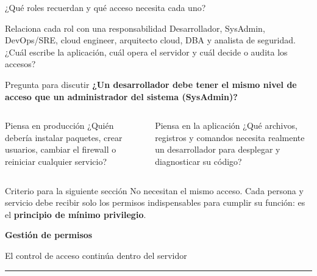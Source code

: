 \documentclass[aspectratio=169,10pt,c]{beamer}
\begin{document}
\begin{frame}{¿Qué roles recuerdan y qué acceso necesita cada uno?}
\begin{block}{Relaciona cada rol con una responsabilidad}
\small Desarrollador, SysAdmin, DevOps/SRE, cloud engineer, arquitecto cloud, DBA y analista de seguridad. ¿Cuál escribe la aplicación, cuál opera el servidor y cuál decide o audita los accesos?
\end{block}
\begin{alertblock}{Pregunta para discutir}
\centering
{\Large\bfseries ¿Un desarrollador debe tener el mismo nivel de acceso que un administrador del sistema (SysAdmin)?}
\end{alertblock}
\begin{columns}[T,onlytextwidth]
\begin{exampleblock}{Piensa en producción}
\small ¿Quién debería instalar paquetes, crear usuarios, cambiar el firewall o reiniciar cualquier servicio?
\end{exampleblock}
\begin{exampleblock}{Piensa en la aplicación}
\small ¿Qué archivos, registros y comandos necesita realmente un desarrollador para desplegar y diagnosticar su código?
\end{exampleblock}
\end{columns}
\begin{block}{Criterio para la siguiente sección}
\small No necesitan el mismo acceso. Cada persona y servicio debe recibir solo los permisos indispensables para cumplir su función: es el \textbf{principio de mínimo privilegio}.
\end{block}
\end{frame}

\begin{frame}[plain]
\vfill
\begin{center}
{\fontsize{29}{34}\selectfont\bfseries Gestión de permisos}\par
\vspace{2mm}
{\small El control de acceso continúa dentro del servidor}\par
\vspace{4mm}
{\color{utpRojo}\rule{8.5cm}{1.2pt}}
\end{center}
\vfill
\end{frame}
\end{document}
